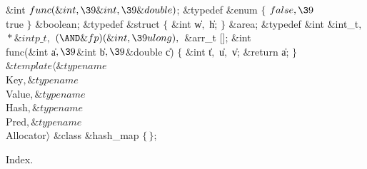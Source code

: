 \Y\B\&{int} ${}\\{func}(\&{int},\39\&{int},\39\&{double}){}$;\6
\&{typedef} \&{enum} ${}\{{}$\1\6
${}\\{false},\39{}$\\{true}\2\6
${}\}{}$ \&{boolean};\6
\&{typedef} \&{struct} ${}\{{}$\1\6
\&{int} \|w${},{}$ \|h;\2\6
${}\}{}$ \&{area};\6
\&{typedef} \&{int} \&{int\_t}${},{}$  ${}{*}\&{intp\_t},{}$  ${}({\AND}%
\&{fp})(\&{int},\39\\{ulong}),{}$  \&{arr\_t} [];\7
\1\1\&{int} \\{func}(\&{int} \|a${},\39{}$\&{int} \|b${},\39{}$\&{double} \|c)%
\2\2\6
${}\{{}$\1\6
\&{int} \|t${},{}$ \|u${},{}$ \|v;\7
\&{return} \|a;\6
\4${}\}{}$\2\7
${}\&{template}\langle\&{typename}{}$ \\{Key}${},\&{typename}{}$ \\{Value}${},%
\&{typename}{}$ \\{Hash}${},\&{typename}{}$ \\{Pred}${},\&{typename}{}$ %
\\{Allocator}${}\rangle{}$\6
\&{class} \&{hash\_map} ${}\{\,\}{}$;\par
\fi

Index.
\fi

\inx
\fin
\con
